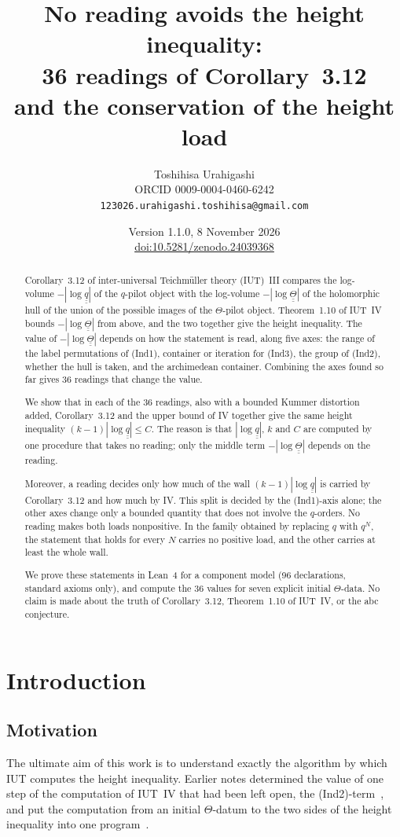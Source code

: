\documentclass[11pt,a4paper]{article}
\title{No reading avoids the height inequality:\\ 36 readings of Corollary~3.12\\ and the conservation of the
height load}
\author{Toshihisa Urahigashi\\\small ORCID 0009-0004-0460-6242\\\small\texttt{123026.urahigashi.toshihisa@gmail.com}}
\date{Version 1.1.0, 8 November 2026\\\small\href{https://doi.org/10.5281/zenodo.24039368}{doi:10.5281/zenodo.24039368}}
\newcommand{\qq}{\underline{\underline{q}}}
\newcommand{\TT}{\underline{\underline{\Theta}}}
\theoremstyle{plain}
\theoremstyle{definition}
\theoremstyle{remark}
\begin{document}
\maketitle

\begin{abstract}
Corollary~3.12 of inter-universal Teichm\"uller theory (IUT)~III compares the log-volume $-|\log\qq|$ of the
$q$-pilot object with the log-volume $-|\log\TT|$ of the holomorphic hull of the union of the possible images of the
$\Theta$-pilot object. Theorem~1.10 of IUT~IV bounds $-|\log\TT|$ from above, and the two together give the height
inequality. The value of $-|\log\TT|$ depends on how the statement is read, along five axes: the range of the label
permutations of (Ind1), container or iteration for (Ind3), the group of (Ind2), whether the hull is taken, and the
archimedean container. Combining the axes found so far gives 36 readings that change the value.

We show that in each of the 36 readings, also with a bounded Kummer distortion added, Corollary~3.12 and the upper
bound of IV together give the same height inequality $(k-1)|\log\qq|\le C$. The reason is that $|\log\qq|$, $k$ and
$C$ are computed by one procedure that takes no reading; only the middle term $-|\log\TT|$ depends on the reading.

Moreover, a reading decides only how much of the wall $(k-1)|\log\qq|$ is carried by Corollary~3.12 and how much by
IV. This split is decided by the (Ind1)-axis alone; the other axes change only a bounded quantity that does not involve
the $q$-orders. No reading makes both loads nonpositive. In the family obtained by replacing $q$ with $q^N$, the
statement that holds for every $N$ carries no positive load, and the other carries at least the whole wall.

We prove these statements in Lean~4 for a component model (96 declarations, standard axioms only), and compute the 36
values for seven explicit initial $\Theta$-data. No claim is made about the truth of Corollary~3.12, Theorem~1.10 of
IUT~IV, or the abc conjecture.
\end{abstract}

\tableofcontents

\section{Introduction}

\subsection{Motivation}
The ultimate aim of this work is to understand exactly the algorithm by which IUT computes the height inequality.
Earlier notes determined the value of one step of the computation of IUT~IV that had been left open, the
(Ind2)-term~\cite{Gap}, and put the computation from an initial $\Theta$-datum to the two sides of the height inequality
into one program~\cite{WT}.
\end{document}
